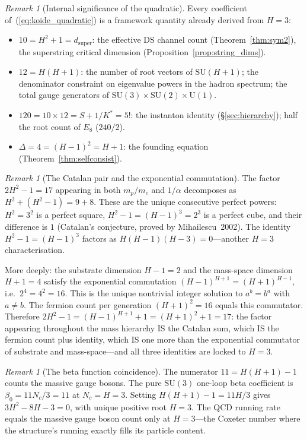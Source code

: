 \documentclass[11pt,a4paper]{article}
\theoremstyle{definition}
\theoremstyle{remark}
\newtheorem{remark}[theorem]{Remark}
\newcommand{\SU}{\mathrm{SU}}
\begin{document}
\begin{remark}[Internal significance of the quadratic]\label{rem:quadratic_connections}
Every coefficient of~(\ref{eq:koide_quadratic}) is a framework quantity already derived from $H=3$:
\begin{itemize}[nosep]
\item $10=H^2+1=d_{\mathrm{super}}$: the effective DS channel count (Theorem~\ref{thm:sym2}), the superstring critical dimension (Proposition~\ref{prop:string_dims}).
\item $12=H(H+1)$: the number of root vectors of $\SU(H\!+\!1)$; the denominator constraint on eigenvalue powers in the hadron spectrum; the total gauge generators of $\SU(3)\times\SU(2)\times\mathrm{U}(1)$.
\item $120=10\times 12=S+1/K^*=5!$: the instanton identity (\S\ref{sec:hierarchy}); half the root count of $E_8$ ($240/2$).
\item $\Delta=4=(H-1)^2=H+1$: the founding equation (Theorem~\ref{thm:selfconsist}).
\end{itemize}
\end{remark}

\begin{remark}[The Catalan pair and the exponential commutation]\label{rem:catalan}
The factor $2H^2-1=17$ appearing in both $m_p/m_e$ and $1/\alpha$ decomposes as $H^2+(H^2-1)=9+8$. These are the unique consecutive perfect powers: $H^2=3^2$ is a perfect square, $H^2-1=(H-1)^3=2^3$ is a perfect cube, and their difference is $1$ (Catalan's conjecture, proved by Mihailescu~2002). The identity $H^2-1=(H-1)^3$ factors as $H(H-1)(H-3)=0$---another $H=3$ characterisation.

More deeply: the substrate dimension $H-1=2$ and the mass-space dimension $H+1=4$ satisfy the exponential commutation $(H-1)^{H+1}=(H+1)^{H-1}$, i.e.\ $2^4=4^2=16$. This is the unique nontrivial integer solution to $a^b=b^a$ with $a\neq b$. The fermion count per generation $(H+1)^2=16$ equals this commutator. Therefore $2H^2-1=(H-1)^{H+1}+1=(H+1)^2+1=17$: the factor appearing throughout the mass hierarchy IS the Catalan sum, which IS the fermion count plus identity, which IS one more than the exponential commutator of substrate and mass-space---and all three identities are locked to $H=3$.
\end{remark}

\begin{remark}[The beta function coincidence]\label{rem:beta_coincidence}
The numerator $11=H(H+1)-1$ counts the massive gauge bosons. The pure $\SU(3)$ one-loop beta coefficient is $\beta_0=11N_c/3=11$ at $N_c=H=3$. Setting $H(H+1)-1=11H/3$ gives $3H^2-8H-3=0$, with unique positive root $H=3$. The QCD running rate equals the massive gauge boson count only at $H=3$---the Coxeter number where the structure's running exactly fills its particle content.
\end{remark}
\end{document}
